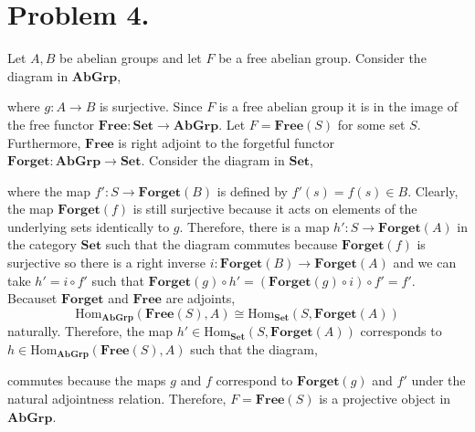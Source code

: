 \documentclass[12pt]{extarticle}
\begin{document}
\section*{Problem 4.}

Let $A, B$ be abelian groups and let $F$ be a free abelian group. Consider the diagram in $\mathbf{AbGrp}$,

\begin{center}
\end{center}
where $g : A \to B$ is surjective. Since $F$ is a free abelian group it is in the image of the free functor $\mathbf{Free} : \mathbf{Set} \to \mathbf{AbGrp}$. Let $F = \mathbf{Free}(S)$ for some set $S$. Furthermore, $\mathbf{Free}$ is right adjoint to the forgetful functor $\mathbf{Forget} : \mathbf{AbGrp} \to \mathbf{Set}$. Consider the diagram in $\mathbf{Set}$,
\begin{center}
\end{center}  
where the map $f' : S \to \mathbf{Forget}(B)$ is defined by $f'(s) = f(s) \in B$. Clearly, the map $\mathbf{Forget}(f)$ is still surjective because it acts on elements of the underlying sets identically to $g$. Therefore, there is a map $h' : S \to \mathbf{Forget}(A)$ in the category $\mathbf{Set}$ such that the diagram commutes because $\mathbf{Forget}(f)$ is surjective so there is a right inverse $i : \mathbf{Forget}(B) \to \mathbf{Forget}(A)$ and we can take $h' = i \circ f'$ such that $\mathbf{Forget}(g) \circ h' = (\mathbf{Forget}(g) \circ i) \circ f' = f'$. Becauset $\mathbf{Forget}$ and $\mathbf{Free}$ are adjoints,
\[ \mathrm{Hom}_{\mathbf{AbGrp}}(\mathbf{Free}(S), A) \cong  \mathrm{Hom}_{\mathbf{Set}}(S, \mathbf{Forget}(A))  \] 
naturally. Therefore, the map $h' \in \mathrm{Hom}_{\mathbf{Set}}(S, \mathbf{Forget}(A))$ corresponds to $h \in \mathrm{Hom}_{\mathbf{AbGrp}}(\mathbf{Free}(S), A)$ such that the diagram,
\begin{center}
\end{center}
commutes because the maps $g$ and $f$ correspond to $\mathbf{Forget}(g)$ and $f'$ under the natural adjointness relation. Therefore, $F = \mathbf{Free}(S)$ is a projective object in $\mathbf{AbGrp}$. 
\end{document}
